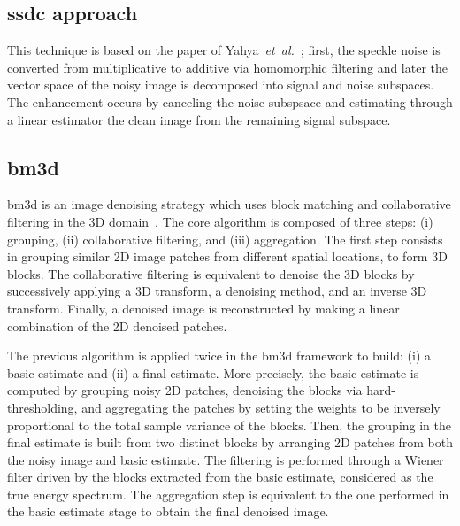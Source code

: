 




\subsection{\acf{ssdc} approach}
This technique is based on the paper of Yahya~\emph{et~al.}~\cite{6717020}; first, the speckle noise is converted from multiplicative to additive via homomorphic filtering and later the vector space of the noisy image is decomposed into signal and noise subspaces.
The enhancement occurs by canceling the noise subspsace and estimating through a linear estimator the clean image from the remaining signal subspace. 

\subsection{\acf{bm3d}}
\ac{bm3d} is an image denoising strategy which uses block matching and collaborative filtering in the 3D domain~\cite{dabov2007image}.
The core algorithm is composed of three steps: (i) grouping, (ii) collaborative filtering, and (iii) aggregation.
The first step consists in grouping similar 2D image patches from different spatial locations, to form 3D blocks.
The collaborative filtering is equivalent to denoise the 3D blocks by successively applying a 3D transform, a denoising method, and an inverse 3D transform.
Finally, a denoised image is reconstructed by making a linear combination of the 2D denoised patches.

The previous algorithm is applied twice in the \ac{bm3d} framework to build: (i) a basic estimate and (ii) a final estimate.
More precisely, the basic estimate is computed by grouping noisy 2D patches, denoising the blocks via hard-thresholding, and aggregating the patches by setting the weights to be inversely proportional to the total sample variance of the blocks.
Then, the grouping in the final estimate is built from two distinct blocks by arranging 2D patches from both the noisy image and basic estimate.
The filtering is performed through a Wiener filter driven by the blocks extracted from the basic estimate, considered as the true energy spectrum.
The aggregation step is equivalent to the one performed in the basic estimate stage to obtain the final denoised image.


